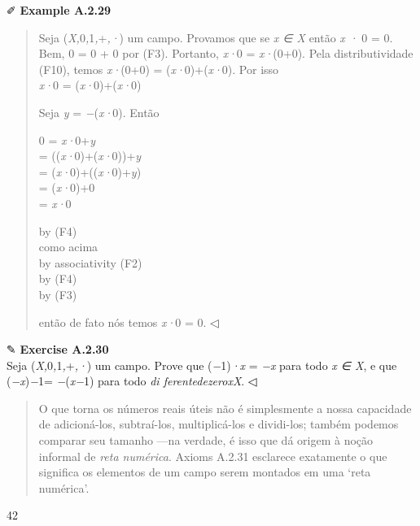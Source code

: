 \documentclass[
]{article}
\begin{document}
✐ \textbf{Example A.2.29}

\begin{quote}
Seja (\emph{X,}0\emph{,}1\emph{,}+\emph{,·}) um campo. Provamos que se
\emph{x ∈ X} então \emph{x ·} 0 = 0. Bem, 0 = 0 + 0 por (F3). Portanto,
\emph{x·}0 = \emph{x·}(0+0). Pela distributividade (F10), temos
\emph{x·}(0+0) = (\emph{x·}0)+(\emph{x·}0). Por isso\\
\emph{x·}0 = (\emph{x·}0)+(\emph{x·}0)

Seja \emph{y} = \emph{−}(\emph{x·}0). Então

0 = \emph{x·}0+\emph{y}\\
= ((\emph{x·}0)+(\emph{x·}0))+\emph{y}\\
= (\emph{x·}0)+((\emph{x·}0)+\emph{y})\\
= (\emph{x·}0)+0\\
= \emph{x·}0

by (F4)\\
como acima\\
by associativity (F2)\\
by (F4)\\
by (F3)

então de fato nós temos \emph{x·}0 = 0. ◁
\end{quote}

✎ \textbf{Exercise A.2.30}\\
Seja (\emph{X,}0\emph{,}1\emph{,}+\emph{,·}) um campo. Prove que
(\emph{−}1)\emph{·x} = \emph{−x} para todo \emph{x ∈ X}, e que
(\emph{−x})\emph{−}1= \emph{−}(\emph{x−}1) para todo \emph{di
ferentedezeroxX}. ◁

\begin{quote}
O que torna os números reais úteis não é simplesmente a nossa capacidade
de adicioná-los, subtraí-los, multiplicá-los e dividi-los; também
podemos comparar seu tamanho ---na verdade, é isso que dá origem à noção
informal de \emph{reta numérica}. Axioms A.2.31 esclarece exatamente o
que significa os elementos de um campo serem montados em uma `reta
numérica'.
\end{quote}

42
\end{document}
